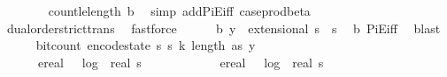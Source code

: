 \begin{isabellebody}
\ \ \ \ \ \ \isamarkupfalse%
\ count{\isacharunderscore}{\kern0pt}le{\isacharunderscore}{\kern0pt}length\ b{}\ \isamarkupfalse%
\ {\isacharparenleft}{\kern0pt}simp\ add{\isacharcolon}{\kern0pt}PiE{\isacharunderscore}{\kern0pt}iff\ case{\isacharunderscore}{\kern0pt}prod{\isacharunderscore}{\kern0pt}beta{\isacharparenright}{\kern0pt}\ \isanewline
\ \ \ \ \ \ \isamarkupfalse%
\ dual{\isacharunderscore}{\kern0pt}order{\isachardot}{\kern0pt}strict{\isacharunderscore}{\kern0pt}trans{}\ \isamarkupfalse%
\ fastforce\isanewline
\ \ \ \ \isamarkupfalse%
\ b{}{\isacharcolon}{\kern0pt}\ {\isachardoublequoteopen}y\ {\isasymin}\ extensional\ {\isacharparenleft}{\kern0pt}{\isacharbraceleft}{\kern0pt}{}{\isachardot}{\kern0pt}{\isachardot}{\kern0pt}{\isacharless}{\kern0pt}s\ {\isasymtimes}\ {\isacharbraceleft}{\kern0pt}{}{\isachardot}{\kern0pt}{\isachardot}{\kern0pt}{\isacharless}{\kern0pt}s\ \isamarkupfalse%
\ b{}\ PiE{\isacharunderscore}{\kern0pt}iff\ \isamarkupfalse%
\ blast\isanewline
\ \ \ \ \isamarkupfalse%
\ {\isachardoublequoteopen}bit{\isacharunderscore}{\kern0pt}count\ {\isacharparenleft}{\kern0pt}encode{\isacharunderscore}{\kern0pt}state\ {\isacharparenleft}{\kern0pt}s\ s\ k{\isacharcomma}{\kern0pt}\ length\ as{\isacharcomma}{\kern0pt}\ y{\isacharparenright}{\kern0pt}{\isacharparenright}{\kern0pt}\ {\isasymle}\ \isanewline
\ \ \ \ \ \ ereal\ {\isacharparenleft}{\kern0pt}{}\ {\isacharasterisk}{\kern0pt}\ log\ {}\ {\isacharparenleft}{\kern0pt}real\ s\ {\isacharplus}{\kern0pt}\ {}{\isacharparenright}{\kern0pt}\ {\isacharplus}{\kern0pt}\ {}{\isacharparenright}{\kern0pt}\ {\isacharplus}{\kern0pt}\ {\isacharparenleft}{\kern0pt}\isanewline
\ \ \ \ \ \ ereal\ {\isacharparenleft}{\kern0pt}{}\ {\isacharasterisk}{\kern0pt}\ log\ {}\ {\isacharparenleft}{\kern0pt}real\ s\ {\isacharplus}{\kern0pt}\ {}{\isacharparenright}{\kern0pt}\ {\isacharplus}{\kern0pt}\ {}{\isacharparenright}{\kern0pt}\ {\isacharplus}{\kern0pt}\ {\isacharparenleft}{\kern0pt}\ \isanewline

\end{isabellebody}
